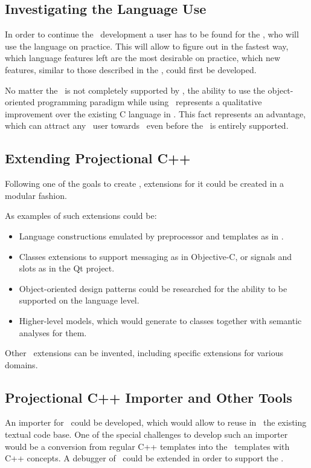 \subsection{Investigating the Language Use}

In order to continue the \pcpp\ development a user has to be found for the \pcpp, who
will use the language on practice. This will allow to figure out in the fastest way,
which language features left are the most desirable on practice, which new features,
similar to those described in the , could first be developed.

No matter the \cpppl\ is not completely supported by \pcpp, the ability to use the
object-oriented programming paradigm while using \mbdr\ represents a qualitative improvement over
the existing C language in \mbdr. This fact represents an advantage, which can
attract any \mbdr\ user towards  \pcpp\ even before the \cpppl\ is entirely supported.

\subsection{Extending Projectional C++}

Following one of the goals to create \pcpp, extensions for it could be created in a 
modular fashion.

As examples of such extensions could be:
\begin{itemize}
 \item Language constructions emulated by preprocessor and templates as in \cite{alexandrescu}.
 \item Classes extensions to support messaging as in Objective-C, or signals and slots as in the Qt project.
 \item Object-oriented design patterns could be researched for the ability to be supported on the 
 language level.
 \item Higher-level models, which would generate to classes together with semantic analyses for them.
\end{itemize}

Other \pcpp\ extensions can be invented, including specific extensions for various domains.


\subsection{Projectional C++ Importer and Other Tools}
An importer for  \pcpp\ could be developed, which would allow to reuse in  \pcpp\ the
existing textual code base. One of the special challenges to develop such an importer would 
be a conversion from regular C++ templates into the \pcpp\ templates with C++ concepts.
A debugger of \mbdr\ could be extended in order to support the \pcpp.


